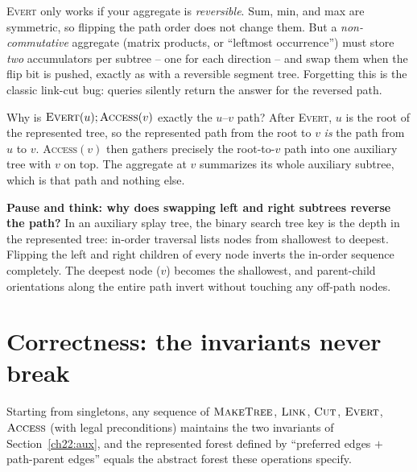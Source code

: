 \begin{trapbox}
\textsc{Evert} only works if your aggregate is \emph{reversible}. Sum, min, and
max are symmetric, so flipping the path order does not change them. But a
\emph{non-commutative} aggregate (matrix products, or ``leftmost occurrence'')
must store \emph{two} accumulators per subtree -- one for each direction -- and
swap them when the flip bit is pushed, exactly as with a reversible segment tree.
Forgetting this is the classic link-cut bug: queries silently return the answer
for the reversed path.
\end{trapbox}

\begin{whybox}
Why is $\textsc{Evert}(u);\textsc{Access}(v)$ exactly the $u$--$v$ path? After
\textsc{Evert}, $u$ is the root of the represented tree, so the represented path
from the root to $v$ \emph{is} the path from $u$ to $v$. \textsc{Access}$(v)$
then gathers precisely the root-to-$v$ path into one auxiliary tree with $v$ on
top. The aggregate at $v$ summarizes its whole auxiliary subtree, which is that
path and nothing else.
\end{whybox}

\begin{recoverybox}
\textbf{Pause and think: why does swapping left and right subtrees reverse the path?}
In an auxiliary splay tree, the binary search tree key is the depth in the represented tree: in-order traversal lists nodes from shallowest to deepest. Flipping the left and right children of every node inverts the in-order sequence completely. The deepest node ($v$) becomes the shallowest, and parent-child orientations along the entire path invert without touching any off-path nodes.
\end{recoverybox}

\section{Correctness: the invariants never break}
\label{ch22:correctness}

\begin{theorem}
\label{ch22:thm-correct}
Starting from singletons, any sequence of $\textsc{MakeTree}$, $\textsc{Link}$,
$\textsc{Cut}$, $\textsc{Evert}$, $\textsc{Access}$ (with legal preconditions)
maintains the two invariants of Section~\ref{ch22:aux}, and the represented
forest defined by ``preferred edges $+$ path-parent edges'' equals the abstract
forest these operations specify.
\end{theorem}

